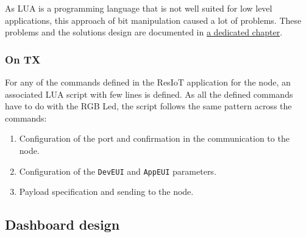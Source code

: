 As LUA is a programming language that is not well suited for low level applications, this approach of bit manipulation caused a lot of problems. These problems and the solutions design are documented in \hyperref[problems]{a dedicated chapter}.

\subsubsection*{On TX}

For any of the commands defined in the ResIoT application for the node, an associated LUA script with few lines is defined. As all the defined commands have to do with the RGB Led, the script follows the same pattern across the commands:
\begin{enumerate}
    \item Configuration of the port and confirmation in the communication to the node.
    \item Configuration of the \texttt{DevEUI} and \texttt{AppEUI} parameters.
    \item Payload specification and sending to the node.
\end{enumerate}
\clearpage
\subsection{Dashboard design}

